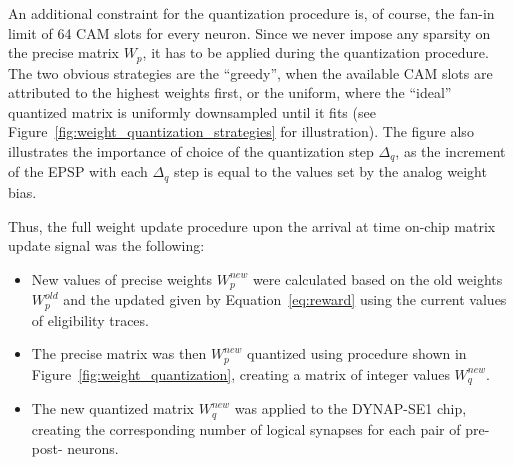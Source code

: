 An additional constraint for the quantization procedure is, of course, the fan-in limit of 64 CAM slots for every neuron. Since we never impose any sparsity on the precise matrix $W_p$, it has to be applied during the quantization procedure. The two obvious strategies are the ``greedy'', when the available CAM slots are attributed to the highest weights first, or the uniform, where the ``ideal'' quantized matrix is uniformly downsampled until it fits (see Figure~\ref{fig:weight_quantization_strategies} for illustration). The figure also illustrates the importance of choice of the quantization step $\Delta_q$, as the increment of the EPSP with each $\Delta_q$ step is equal to the values set by the analog weight bias.

Thus, the full weight update procedure upon the arrival at time on-chip matrix update signal was the following:
\begin{itemize}
    \item New values of precise weights $W_p^{new}$ were calculated based on the old weights $W_p^{old}$ and the updated given by Equation~\ref{eq:reward} using the current values of eligibility traces.
    \item The precise matrix was then $W_p^{new}$ quantized using procedure shown in Figure~\ref{fig:weight_quantization}, creating a matrix of integer values $W_q^{new}$.
    \item The new quantized matrix $W_q^{new}$ was applied to the DYNAP-SE1 chip, creating the corresponding number of logical synapses for each pair of pre- post- neurons.
\end{itemize}

